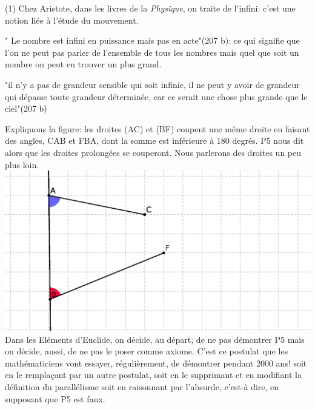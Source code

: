 \documentclass[a4paper, 12pt, twoside]{book}
\begin{document}
    
\begin{footnotesize}
(1) Chez Aristote, dans les livres de la \textit{Physique}, on traite de l'infini: c'est une notion liée à l'étude du mouvement. \

" Le nombre est infini en puissance mais pas en acte"(207 b): ce qui signifie que l'on ne peut pas parler de l'ensemble de tous les nombres mais quel que soit un nombre on peut en trouver un plus grand.\

"il n'y a pas de grandeur sensible qui soit infinie, il ne peut y avoir de grandeur qui dépasse toute grandeur déterminée, car ce serait une chose plus grande que le ciel"(207 b) 
\end{footnotesize}
    
 
   
   
   
   
   
    \newpage Expliquons la figure: les droites (AC) et (BF) coupent une même droite en faisant des angles, CAB et FBA, dont la somme est inférieure à 180 degrés. P5 nous dit alors que les droites prolongées se couperont. Nous parlerons des droites un peu plus loin.\\
    
    
    \includegraphics[scale=0.7]{figures/euc1.eps} \\
    
     
   
 
 
   Dans les Eléments d'Euclide, on décide, au départ, de ne pas démontrer P5 mais on décide, aussi, de ne pas le poser comme axiome. C'est ce postulat que les mathématiciens vont essayer, régulièrement, de démontrer pendant 2000 ans! soit en le remplaçant par un autre postulat, soit en le supprimant et en modifiant la définition du parallélisme soit en raisonnant par l'absurde, c'est-à dire, en supposant que P5 est faux. \
   
\end{document}
